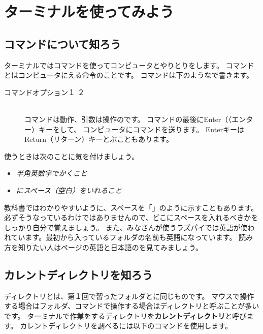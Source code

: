 
\section{ターミナルを使ってみよう}
\subsection{コマンドについて知ろう}

ターミナルではコマンドを使ってコンピュータとやりとりをします。
コマンドとはコンピュータにえる命令のことです。
コマンドは下のようなで書きます。

\begin{description}
\item[コマンド\textvisiblespace オプション\textvisiblespace {}１\textvisiblespace 
{}２]\mbox{}\\
コマンドは動作、引数は操作のです。
 コマンドの最後にEnter（（エンター）キーをして、
 コンピュータにコマンドを送ります。
 EnterキーはReturn（リターン）キーとぶこともあります。
\end{description}

使うときは次のことに気を付けましょう。
\begin{itemize}
\item \emph{半角英数字でかくこと}
\item \emph{にスペース（空白）をいれること}
\end{itemize}


教科書ではわかりやすいように、スペースを「\textvisiblespace 」のように示すこともあります。
必ずそうなっているわけではありませんので、どこにスペースを入れるべきかをしっかり自分で覚えましょう。
また、みなさんが使うラズパイでは英語が使われています。最初から入っているフォルダの名前も英語になっています。
読み方を知りたい人は\pageref{英語と日本語の対応表}ページの英語と日本語のを見てみましょう。

\subsection{カレントディレクトリを知ろう}
ディレクトリとは、第１回で習ったフォルダとに同じものです。
マウスで操作する場合はフォルダ、コマンドで操作する場合はディレクトリと呼ぶことが多いです。
ターミナルで作業をするディレクトリを{\bf カレントディレクトリ}と呼びます。
カレントディレクトリを調べるには以下のコマンドを使用します。

